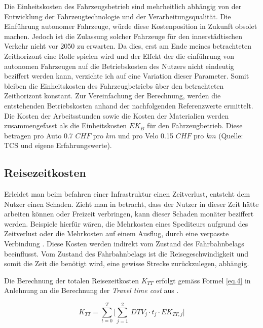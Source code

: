 Die Einheitskosten des Fahrzeugsbetrieb sind mehrheitlich abhängig von der Entwicklung der Fahrzeugtechnologie und der Verarbeitungsqualität. 
Die Einführung autonomer Fahrzeuge, würde diese Kostenposition in Zukunft obsolet machen. Jedoch ist die Zulassung solcher Fahrzeuge für den innerstädtischen Verkehr nicht vor 2050 zu erwarten. Da dies, erst am Ende meines betrachteten Zeithorizont eine Rolle spielen wird und der Effekt der die einführung von autonomen Fahrzeugen auf die Betriebskosten des Nutzers nicht eindeutig beziffert werden kann, verzichte ich auf eine Variation dieser Parameter. Somit bleiben die Einheitskosten des Fahrzeugbetriebs über den betrachteten Zeithorizont konstant.
Zur Vereinfachung der Berechnung, werden die entstehenden Betriebskosten anhand der nachfolgenden Referenzwerte ermittelt.
Die Kosten der Arbeitsstunden sowie die Kosten der Materialien werden zusammengefasst als die Einheitskosten $EK_{B}$ für den Fahrzeugbetrieb.
Diese betragen pro Auto 0.7 $CHF$ pro $km$ und pro Velo 0.15 $CHF$ pro $km$ (Quelle: TCS und eigene Erfahrungswerte). 



\subsection*{Reisezeitkosten}
\label{sub:Reisezeit}

Erleidet man beim befahren einer Infrastruktur einen Zeitverlust, entsteht dem Nutzer einen Schaden. Zieht man in betracht, dass der Nutzer in dieser Zeit hätte arbeiten können oder Freizeit verbringen, kann dieser Schaden monäter beziffert werden. Beispiele hierfür wären, die Mehrkosten eines Spediteurs aufgrund des Zeitverlust oder die Mehrkosten auf einem Ausflug, durch eine verpasste Verbindung .
Diese Kosten werden indirekt vom Zustand des Fahrbahnbelags beeinflusst. Vom Zustand des Fahrbahnbelags ist die Reisegeschwindigkeit und somit die Zeit die benötigt wird, eine gewisse Strecke zurückzulegen, abhängig.

Die Berechnung der totalen Reisezeitkosten $K_{TT}$ erfolgt gemäss Formel \ref{eq.4} in Anlehnung an die Berechnung der \textit{Travel time cost} aus \cite[S.643]{Adey2012}.

\begin{equation}
K_{TT} = \sum_{t=0}^T \Biggl[ \sum_{j=1}^2 \ DTV_{j} \cdot t_{j} \cdot EK_{TT,j} \Biggr]  \label{eq.4}
\end{equation}

